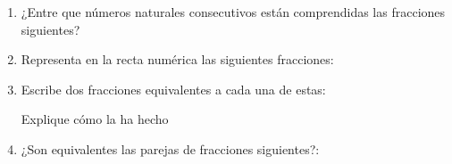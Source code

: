 \documentclass[10pt,twoside]{article}
\begin{document}
\begin{enumerate}
\begin{enumerate}
\end{enumerate}
\item ¿Entre que números naturales consecutivos están comprendidas las fracciones siguientes?
\begin{enumerate}
\end{enumerate}
\item Representa en la recta numérica las siguientes fracciones:
\begin{enumerate}
\end{enumerate}
\item Escribe dos fracciones equivalentes a cada una de estas:
\begin{enumerate}
\end{enumerate}
Explique cómo la ha hecho
\item ¿Son equivalentes las parejas de fracciones siguientes?:
\begin{enumerate}

\end{enumerate}
\end{enumerate}
\end{document}
